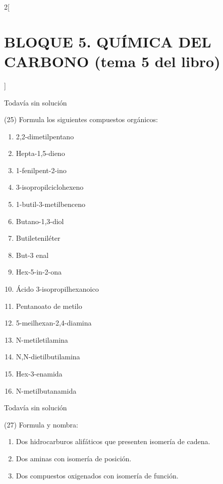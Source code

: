 \documentclass[10pt]{article}
\begin{document}
\begin{multicols}{2}[
  \section{BLOQUE 5. QUÍMICA DEL CARBONO (tema 5 del libro)}
  ]
\begin{solution}[print=false]
  Todavía sin solución
\end{solution}




\begin{exercise}[
    tags    = {},
    topics  = {química,química básica},
    source  = {FQ 1B MGH 2016, p85, e26},
  ]

  (25) Formula los siguientes compuestos orgánicos:
  \begin{enumerate}
    \item 2,2-dimetilpentano
    \item Hepta-1,5-dieno
    \item 1-fenilpent-2-ino
    \item 3-isopropilciclohexeno
    \item 1-butil-3-metilbenceno
    \item Butano-1,3-diol
    \item Butileteniléter
    \item But-3 enal
    \item Hex-5-in-2-ona
    \item Ácido 3-isopropilhexanoico
    \item Pentanoato de metilo
    \item 5-meilhexan-2,4-diamina
    \item N-metiletilamina
    \item N,N-dietilbutilamina
    \item Hex-3-enamida
    \item N-metilbutanamida
  \end{enumerate}
\end{exercise}

\begin{solution}[print=false]
  Todavía sin solución
\end{solution}




\begin{exercise}[
    tags    = {},
    topics  = {química,química básica},
    source  = {FQ 1B MGH 2016, p85, e26},
  ]

  (27) Formula y nombra:
  \begin{enumerate}
    \item Dos hidrocarburos alifáticos que presenten isomería de cadena.
    \item Dos aminas con isomería de posición.
    \item Dos compuestos oxigenados con isomería de función.
  \end{enumerate}
\end{exercise}


\end{multicols}
\end{document}
